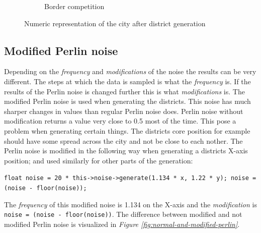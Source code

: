 \begin{figure}[h]
\begin{subfigure}{0.5\textwidth}
				\caption{Border competition}
				\label{fig:map-borders}
			\end{subfigure}
			\caption{Numeric representation of the city after district generation}
			\label{fig:map-districts-and-borders}
		\end{figure}
		
		\subsection{Modified Perlin noise}
		Depending on the \textit{frequency} and \textit{modifications} of the noise the results can be very different. The steps at which the data is sampled is what the \textit{frequency} is. If the results of the Perlin noise is changed further this is what \textit{modifications} is.
		The modified Perlin noise is used when generating the districts. This noise has much sharper changes in values than regular Perlin noise does. Perlin noise without modification returns a value very close to 0.5 most of the time. This pose a problem when generating certain things. The districts core position for example should have some spread across the city and not be close to each nother. The Perlin noise is modified in the following way when generating a districts X-axis position; and used similarly for other parts of the generation:
		
		\texttt{float noise = 20 * this->noise->generate(1.134 * x, 1.22 * y);
			noise = (noise - floor(noise));}
		
		The \textit{frequency} of this modified noise is 1.134 on the X-axis and the \textit{modification} is \texttt{noise = (noise - floor(noise))}.
		The difference between modified and not modified Perlin noise is visualized in \textit{Figure \ref{fig:normal-and-modified-perlin}}.
		
